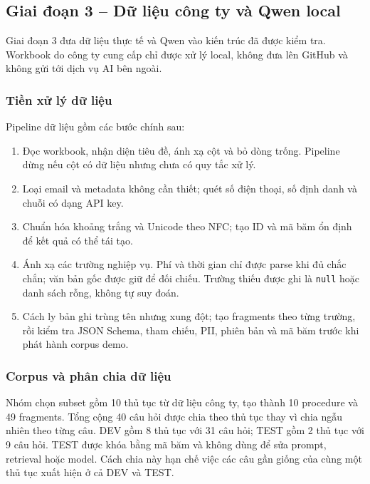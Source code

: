 \documentclass[runningheads]{llncs}
\begin{document}
\subsection{Giai đoạn 3 -- Dữ liệu công ty và Qwen local}

Giai đoạn 3 đưa dữ liệu thực tế và Qwen vào kiến trúc đã được kiểm tra. Workbook
do công ty cung cấp chỉ được xử lý local, không đưa lên GitHub và không gửi tới
dịch vụ AI bên ngoài.

\subsubsection{Tiền xử lý dữ liệu}

Pipeline dữ liệu gồm các bước chính sau:

\begin{enumerate}
    \item Đọc workbook, nhận diện tiêu đề, ánh xạ cột và bỏ dòng trống. Pipeline
    dừng nếu cột có dữ liệu nhưng chưa có quy tắc xử lý.
    \item Loại email và metadata không cần thiết; quét số điện thoại, số định danh
    và chuỗi có dạng API key.
    \item Chuẩn hóa khoảng trắng và Unicode theo NFC; tạo ID và mã băm ổn định để
    kết quả có thể tái tạo.
    \item Ánh xạ các trường nghiệp vụ. Phí và thời gian chỉ được parse khi đủ chắc
    chắn; văn bản gốc được giữ để đối chiếu. Trường thiếu được ghi là
    \texttt{null} hoặc danh sách rỗng, không tự suy đoán.
    \item Cách ly bản ghi trùng tên nhưng xung đột; tạo fragments theo từng trường,
    rồi kiểm tra JSON Schema, tham chiếu, PII, phiên bản và mã băm trước khi phát
    hành corpus demo.
\end{enumerate}

\subsubsection{Corpus và phân chia dữ liệu}

Nhóm chọn subset gồm 10 thủ tục từ dữ liệu công ty, tạo thành 10 procedure và 49
fragments. Tổng cộng 40 câu hỏi được chia theo thủ tục thay vì chia ngẫu nhiên
theo từng câu. DEV gồm 8 thủ tục với 31 câu hỏi; TEST gồm 2 thủ tục với 9 câu hỏi.
TEST được khóa bằng mã băm và không dùng để sửa prompt, retrieval hoặc model.
Cách chia này hạn chế việc các câu gần giống của cùng một thủ tục xuất hiện ở cả
DEV và TEST.
\end{document}
